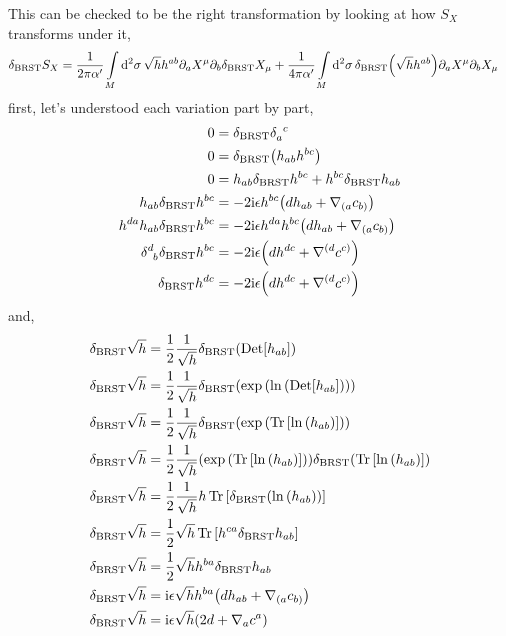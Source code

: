 This can be checked to be the right transformation by looking at how $S_X$ transforms under it,
\begin{align*}
    \delta_{\textnormal{BRST}}S_X&=\frac{1}{2\pi\alpha'}\int\limits_{M}\dd[2]{\sigma}\sqrt{h}h^{ab}\partial_aX^\mu\partial_b \delta_{\textnormal{BRST}}X_\mu+\frac{1}{4\pi\alpha'}\int\limits_{M}\dd[2]{\sigma}\delta_{\textnormal{BRST}}\qty(\sqrt{h}h^{ab})\partial_aX^\mu\partial_b X_\mu
\end{align*}
first, let's understood each variation part by part,
\begin{align*}
    0&=\delta_{\textnormal{BRST}}\tensor{\delta}{_a^c}\\
    0&=\delta_{\textnormal{BRST}}\qty(h_{ab}h^{bc})\\
    0&=h_{ab}\delta_{\textnormal{BRST}}h^{bc}+h^{bc}\delta_{\textnormal{BRST}}h_{ab}\\
    h_{ab}\delta_{\textnormal{BRST}}h^{bc}&=-2\im\epsilon h^{bc}\qty(d h_{ab}+\nabla_{(a} c_{b)})\\
    h^{da}h_{ab}\delta_{\textnormal{BRST}}h^{bc}&=-2\im\epsilon h^{da}h^{bc}\qty(d h_{ab}+\nabla_{(a} c_{b)})\\
    \tensor{\delta}{^d_b}\delta_{\textnormal{BRST}}h^{bc}&=-2\im\epsilon \qty(d \tensor{h}{^d^c}+\nabla^{(d} c^{c)})\\
    \delta_{\textnormal{BRST}}h^{dc}&=-2\im\epsilon \qty(d \tensor{h}{^d^c}+\nabla^{(d} c^{c)})
\end{align*}
and,
\begin{align*}
    \delta_{\textnormal{BRST}}\sqrt{h}&=\frac12\frac{1}{\sqrt{h}}\delta_{\textnormal{BRST}}\qty(\textup{Det} \qty[h_{ab}])\\
    \delta_{\textnormal{BRST}}\sqrt{h}&=\frac12\frac{1}{\sqrt{h}}\delta_{\textnormal{BRST}}\qty(\exp\qty(\ln\qty(\textup{Det} \qty[h_{ab}])))\\
    \delta_{\textnormal{BRST}}\sqrt{h}&=\frac12\frac{1}{\sqrt{h}}\delta_{\textnormal{BRST}}\qty(\exp\qty(\Tr\qty[\ln\qty(h_{ab})]))\\
    \delta_{\textnormal{BRST}}\sqrt{h}&=\frac12\frac{1}{\sqrt{h}}\qty(\exp\qty(\Tr\qty[\ln\qty(h_{ab})]))\delta_{\textnormal{BRST}}\qty(\Tr\qty[\ln\qty(h_{ab})])\\
    \delta_{\textnormal{BRST}}\sqrt{h}&=\frac12\frac{1}{\sqrt{h}}h\Tr\qty[\delta_{\textnormal{BRST}}\qty(\ln\qty(h_{ab}))]\\
    \delta_{\textnormal{BRST}}\sqrt{h}&=\frac12\sqrt{h}\Tr\qty[h^{ca}\delta_{\textnormal{BRST}}h_{ab}]\\
    \delta_{\textnormal{BRST}}\sqrt{h}&=\frac12\sqrt{h}h^{ba}\delta_{\textnormal{BRST}}h_{ab}\\
    \delta_{\textnormal{BRST}}\sqrt{h}&=\textnormal{i}\epsilon\sqrt{h}h^{ba}\qty(d h_{ab}+\nabla_{(a}c_{b)})\\
    \delta_{\textnormal{BRST}}\sqrt{h}&=\textnormal{i}\epsilon\sqrt{h}\qty(2d+\nabla_ac^a)
\end{align*}

